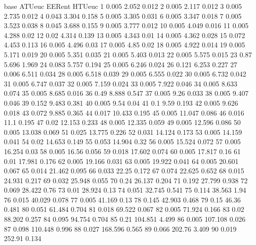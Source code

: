 base ATUeuc EERent HTUeuc
1 0.005 2.052 0.012
2 0.005 2.117 0.012
3 0.005 2.735 0.012
4 0.043 3.304 0.158
5 0.005 3.305 0.031
6 0.005 3.347 0.018
7 0.005 3.523 0.038
8 0.045 3.688 0.155
9 0.005 3.777 0.012
10 0.005 4.049 0.016
11 0.005 4.288 0.02
12 0.02 4.314 0.139
13 0.005 4.343 0.01
14 0.005 4.362 0.028
15 0.072 4.453 0.113
16 0.005 4.496 0.03
17 0.005 4.85 0.02
18 0.005 4.922 0.014
19 0.005 5.171 0.019
20 0.005 5.351 0.035
21 0.005 5.403 0.013
22 0.005 5.575 0.015
23 0.87 5.696 1.969
24 0.083 5.757 0.194
25 0.005 6.246 0.024
26 0.121 6.253 0.227
27 0.006 6.511 0.034
28 0.005 6.518 0.039
29 0.005 6.555 0.022
30 0.005 6.732 0.042
31 0.005 6.747 0.037
32 0.005 7.159 0.024
33 0.005 7.922 0.046
34 0.005 8.633 0.074
35 0.005 8.685 0.016
36 0.49 8.888 0.547
37 0.005 9.26 0.033
38 0.005 9.407 0.046
39 0.152 9.483 0.381
40 0.005 9.54 0.04
41 0.1 9.59 0.193
42 0.005 9.626 0.018
43 0.072 9.885 0.365
44 0.017 10.433 0.195
45 0.005 11.047 0.086
46 0.016 11.1 0.195
47 0.02 12.153 0.233
48 0.005 12.335 0.059
49 0.005 12.596 0.086
50 0.005 13.038 0.069
51 0.025 13.775 0.226
52 0.031 14.124 0.173
53 0.005 14.159 0.041
54 0.02 14.653 0.149
55 0.053 14.904 0.32
56 0.005 15.524 0.072
57 0.005 16.254 0.03
58 0.005 16.56 0.056
59 0.018 17.602 0.074
60 0.005 17.817 0.16
61 0.01 17.981 0.176
62 0.005 19.166 0.031
63 0.005 19.922 0.041
64 0.005 20.601 0.067
65 0.014 21.462 0.095
66 0.033 22.25 0.172
67 0.074 22.625 0.652
68 0.015 24.931 0.217
69 0.032 25.948 0.055
70 0.24 26.137 0.204
71 0.192 27.799 0.938
72 0.069 28.422 0.76
73 0.01 28.924 0.13
74 0.051 32.745 0.541
75 0.114 38.563 1.94
76 0.015 40.029 0.078
77 0.005 41.169 0.13
78 0.145 42.903 0.468
79 0.15 46.36 0.481
80 0.051 61.484 0.704
81 0.018 69.522 0.067
82 0.005 71.924 0.166
83 0.02 88.202 0.257
84 0.095 94.754 0.704
85 0.21 104.851 4.499
86 0.005 107.108 0.026
87 0.098 110.448 0.996
88 0.027 168.596 0.565
89 0.066 202.76 3.409
90 0.019 252.91 0.134